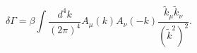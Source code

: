 \begin{equation}
\delta\Gamma=\beta\int \frac{d^4k}{(2\pi)^4}A_\mu(k)A_\nu(-k)\frac{\tilde k_\mu
\tilde k_\nu}{(\tilde k^2)^2}. \label{gaugecounter}
\end{equation}

